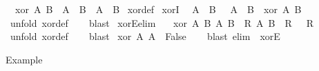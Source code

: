 \begin{isabellebody}
\ \ {\isachardoublequoteopen}xor\ A\ B\ {\isasymequiv}\ {\isacharparenleft}{\kern0pt}A\ {\isasymand}\ {\isasymnot}B{\isacharparenright}{\kern0pt}\ {\isasymor}\ {\isacharparenleft}{\kern0pt}{\isasymnot}A\ {\isasymand}\ B{\isacharparenright}{\kern0pt}{\isachardoublequoteclose}\isanewline
\isanewline
{}\isamarkupfalse%
\ xor{\isacharunderscore}{\kern0pt}def\isanewline
\isanewline
{}\isamarkupfalse%
\ xorI{\isacharcolon}{\kern0pt}\isanewline
\ \ {\isachardoublequoteopen}A\ {\isasymor}\ B\ {\isasymLongrightarrow}\ {\isasymnot}\ {\isacharparenleft}{\kern0pt}A\ {\isasymand}\ B{\isacharparenright}{\kern0pt}\ {\isasymLongrightarrow}\ xor\ A\ B{\isachardoublequoteclose}\isanewline
%
\isadelimproof
\ \ %
\endisadelimproof
%
\isatagproof
{}\isamarkupfalse%
\ {\isacharparenleft}{\kern0pt}unfold\ xor{\isacharunderscore}{\kern0pt}def{\isacharparenright}{\kern0pt}\isanewline
\ \ \isamarkupfalse%
\ blast%
\endisatagproof
{\isafoldproof}%
%
\isadelimproof
\isanewline
%
\endisadelimproof
\isanewline
{}\isamarkupfalse%
\ xorE{\isacharbrackleft}{\kern0pt}elim{\isacharbang}{\kern0pt}{\isacharbrackright}{\kern0pt}{\isacharcolon}{\kern0pt}\isanewline
\ \ {\isachardoublequoteopen}{\isasymlbrakk}\ xor\ A\ B{\isacharsemicolon}{\kern0pt}\ {\isasymlbrakk}A{\isacharsemicolon}{\kern0pt}\ {\isasymnot}B{\isasymrbrakk}\ {\isasymLongrightarrow}\ R{\isacharsemicolon}{\kern0pt}\ {\isasymlbrakk}{\isasymnot}A{\isacharsemicolon}{\kern0pt}\ B{\isasymrbrakk}\ {\isasymLongrightarrow}\ R\ {\isasymrbrakk}\ {\isasymLongrightarrow}\ R{\isachardoublequoteclose}\isanewline
%
\isadelimproof
\ \ %
\endisadelimproof
%
\isatagproof
{}\isamarkupfalse%
\ {\isacharparenleft}{\kern0pt}unfold\ xor{\isacharunderscore}{\kern0pt}def{\isacharparenright}{\kern0pt}\isanewline
\ \ \isamarkupfalse%
\ blast%
\endisatagproof
{\isafoldproof}%
%
\isadelimproof
\isanewline
%
\endisadelimproof
\isanewline
{}\isamarkupfalse%
\ {\isachardoublequoteopen}xor\ A\ A\ {\isacharequal}{\kern0pt}\ False{\isachardoublequoteclose}\isanewline
%
\isadelimproof
\ \ %
\endisadelimproof
%
\isatagproof
{}\isamarkupfalse%
\ {\isacharparenleft}{\kern0pt}blast\ elim{\isacharbang}{\kern0pt}\ {\isacharcolon}{\kern0pt}\ xorE{\isacharparenright}{\kern0pt}\isanewline
\ \ \isamarkupfalse%
%
\endisatagproof
{\isafoldproof}%
%
\isadelimproof
%
\endisadelimproof
%
\begin{isamarkuptext}%
Example%
\end{isamarkuptext}\isamarkuptrue%

\end{isabellebody}
